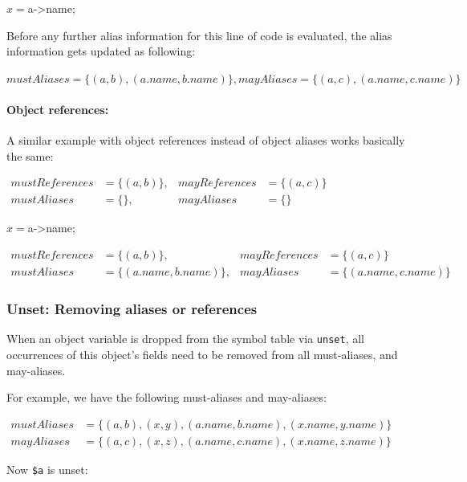 \begin{phpcode}
$x = $a->name;
\end{phpcode}

Before any further alias information for this line of code is evaluated, the alias information gets updated as following:

$mustAliases = \{(a, b), (a.name, b.name)\}, mayAliases = \{(a, c), (a.name, c.name)\}$


\paragraph{Object references:} A similar example with object references instead of object aliases works basically the same:

$\begin{array}{llll}
mustReferences & = \{(a, b)\}, & mayReferences & = \{(a, c)\} \\
mustAliases & = \{\}, & mayAliases & = \{\}
\end{array}$

\begin{phpcode}
$x = $a->name;
\end{phpcode}

$\begin{array}{llll}
mustReferences & = \{(a, b)\}, & mayReferences & = \{(a, c)\} \\
mustAliases & = \{(a.name, b.name)\}, & mayAliases & = \{(a.name, c.name)\}
\end{array}$


\subsubsection{Unset: Removing aliases or references}

When an object variable is dropped from the symbol table via \texttt{unset}, all occurrences of this object's fields need to be removed from all must-aliases, and may-aliases.

For example, we have the following must-aliases and may-aliases:

$\begin{array}{ll}
mustAliases & = \{(a, b), (x, y), (a.name, b.name), (x.name, y.name)\} \\
mayAliases & = \{(a, c), (x, z), (a.name, c.name), (x.name, z.name)\}
\end{array}$

Now \texttt{\$a} is unset:


